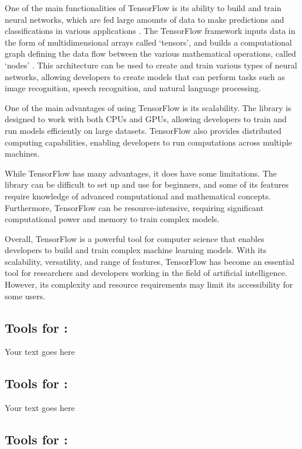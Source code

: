 \documentclass[a4paper, 11pt]{report}
\begin{document}
One of the main functionalities of TensorFlow is its ability to build and train neural networks, which are fed large amounts of data to make predictions and classifications in various applications \cite{ibm}. The TensorFlow framework inputs data in the form of multidimensional arrays called ‘tensors’, and builds a computational graph defining the data flow between the various mathematical operations, called ‘nodes’ \cite{simplilearn}. This architecture can be used to create and train various types of neural networks, allowing developers to create models that can perform tasks such as image recognition, speech recognition, and natural language processing.

One of the main advantages of using TensorFlow is its scalability. The library is designed to work with both CPUs and GPUs, allowing developers to train and run models efficiently on large datasets. TensorFlow also provides distributed computing capabilities, enabling developers to run computations across multiple machines.

While TensorFlow has many advantages, it does have some limitations. The library can be difficult to set up and use for beginners, and some of its features require knowledge of advanced computational and mathematical concepts. Furthermore, TensorFlow can be resource-intensive, requiring significant computational power and memory to train complex models.

Overall, TensorFlow is a powerful tool for computer science that enables developers to build and train complex machine learning models. With its scalability, versatility, and range of features, TensorFlow has become an essential tool for researchers and developers working in the field of artificial intelligence. However, its complexity and resource requirements may limit its accessibility for some users.

\subsection{Tools for \majB: \studB}

Your text goes here

\subsection{Tools for \majC: \studC}

Your text goes here

\subsection{Tools for \majD: \studD}
\end{document}
